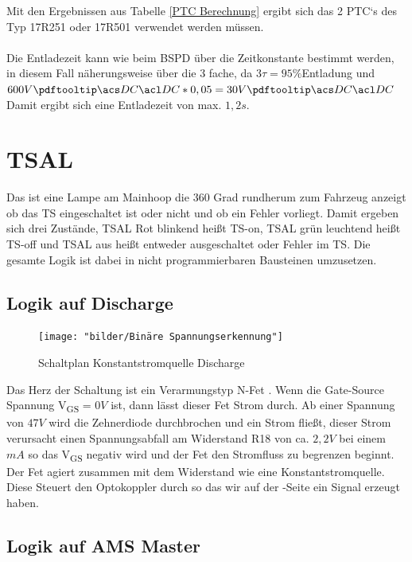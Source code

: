 Mit den Ergebnissen aus Tabelle \ref{PTC Berechnung} ergibt sich das 2 \ac{PTC}`s des Typ 17R251 oder 17R501 verwendet werden müssen. 
\\
\\
Die Entladezeit kann wie beim \ac{BSPD} über die Zeitkonstante bestimmt werden, in diesem Fall näherungsweise über die 3 fache, da \ensuremath{3\tau = 95\%}Entladung und \ensuremath{600V\ac{DC} * 0,05 = 30V\ac{DC}} Damit ergibt sich eine Entladezeit von max. \ensuremath{1,2 s}.

\FloatBarrier
\section{\ac{TSAL}}
Das  ist eine Lampe am Mainhoop die 360 Grad rundherum zum Fahrzeug anzeigt ob das \ac{TS} eingeschaltet ist oder nicht und ob ein Fehler vorliegt. Damit ergeben sich drei Zustände, \ac{TSAL} Rot blinkend heißt \ac{TS}-on, \ac{TSAL} grün leuchtend heißt \ac{TS}-off und \ac{TSAL} aus heißt entweder  ausgeschaltet oder Fehler im \ac{TS}. Die gesamte Logik ist dabei in nicht programmierbaren Bausteinen umzusetzen.

\FloatBarrier
\subsection{Logik auf Discharge}
\label{sec: TSAL Logik Discharge}
\begin{figure}
	\centering
	\texttt{[image: "bilder/Binäre Spannungserkennung"]}
	\caption{Schaltplan Konstantstromquelle Discharge}
	\label{fig:binare-spannungserkennung}
\end{figure}

Das Herz der Schaltung ist ein Verarmungstyp N-Fet \cite{IXTA08N100D2HV}. Wenn die Gate-Source Spannung V\textsubscript{GS} = \ensuremath{0 V} ist, dann lässt dieser Fet Strom durch. Ab einer Spannung von \ensuremath{47 V} wird die Zehnerdiode durchbrochen und ein Strom fließt, dieser Strom verursacht einen Spannungsabfall am Widerstand R18 von ca. \ensuremath{2,2 V} bei einem \ensuremath{mA} so das V\textsubscript{GS} negativ wird und der Fet den Stromfluss zu begrenzen beginnt. Der Fet agiert zusammen mit dem Widerstand wie eine Konstantstromquelle. Diese Steuert den Optokoppler durch so das wir auf der -Seite ein Signal erzeugt haben.

\FloatBarrier
\subsection{Logik auf \ac{AMS} Master}


